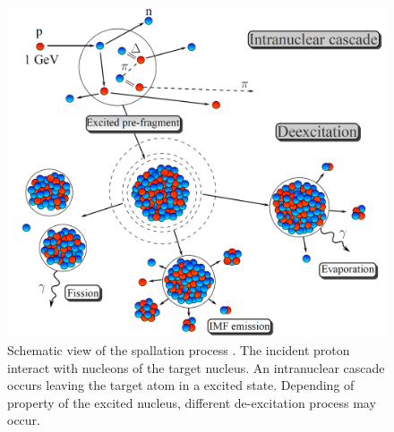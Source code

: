 \begin{figure}[!ht]
	\begin{center}
		\includegraphics[width=\textwidth]{01_Introduction/figures/fig000_spallation}
	\end{center}
	\caption[Schematic view of the spallation process.]{Schematic view of the spallation process \cite{gorbinet:tel-00660583}. The incident proton interact with nucleons of the target nucleus. An intranuclear cascade occurs leaving the target atom in a excited state. Depending of property of the excited nucleus, different de-excitation process may occur.}
	\label{chap1:fig:spallation}
\end{figure}
